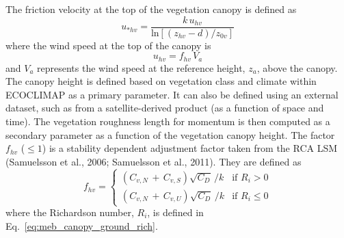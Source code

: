 The friction velocity at the top of the vegetation canopy is
defined as
%
\begin{equation}
  \label{eq:meb_ustar_cantop}
u_{\ast hv} = {\frac{k \, u_{hv}}
{{\mathrm{ln}}\left[
\left( z_{hv} - d \right)/z_{0v}\right]}}
\end{equation}
%
where the wind speed at the top of the canopy is
%
\begin{equation}
  \label{eq:meb_u_cantop}
u_{hv} = f_{hv} \, V_a
\end{equation}
%
and $V_a$ represents the wind speed at the reference height, $z_a$,
above the canopy. 
%
The canopy height is defined based on vegetation
class and climate within ECOCLIMAP as a primary parameter. It can
also be defined using an external dataset, such as from a satellite-derived product (as a function of space and time). The vegetation
roughness length for momentum is then computed as a secondary
parameter as a function of the vegetation canopy height.
%
The factor $f_{hv}$ ($\leq 1$) is a stability dependent adjustment factor
taken from the RCA LSM 
(Samuelsson et al., 2006; Samuelsson et al., 2011)\nocite{Samuelsson06,Samuelsson11}.
They are defined as
%
\[ f_{hv} = \left\{ \begin{array}{ll}
        \left( C_{v,N} \,+\, C_{v,S}\right) \sqrt{C_D} \, /k
& \mbox{if $R_i > 0 $}
\\
        \left( C_{v,N} \,+\, C_{v,U}\right) \sqrt{C_D} \, /k
& \mbox{if $R_i \leq 0$}
\end{array} 
\right. \] 
%
%
where the Richardson number, $R_i$, is defined 
in Eq.~\ref{eq:meb_canopy_ground_rich}.
